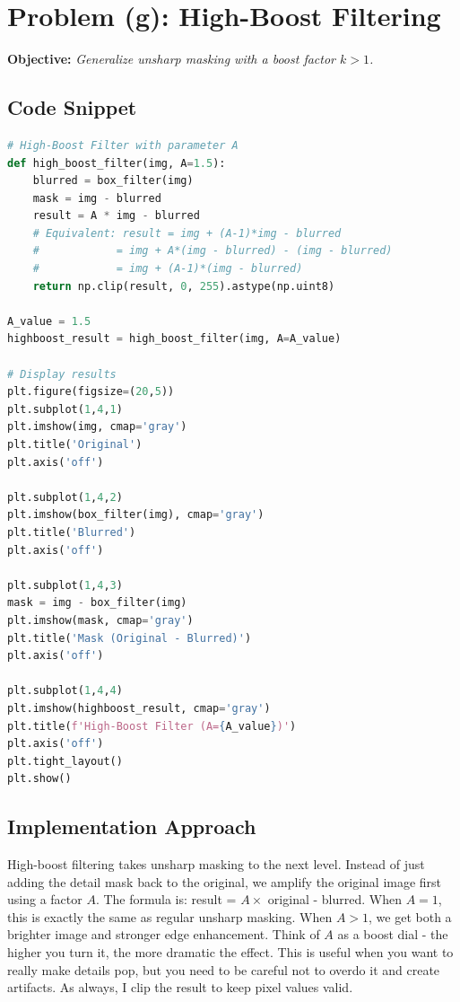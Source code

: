 \documentclass[12pt,a4paper]{report}
\begin{document}
\section{Problem (g): High-Boost Filtering}
\textbf{Objective:} \textit{Generalize unsharp masking with a boost factor \(k>1\).}

\subsection{Code Snippet}
\begin{lstlisting}[language=Python, caption={High-Boost Filtering}]
# High-Boost Filter with parameter A
def high_boost_filter(img, A=1.5):
    blurred = box_filter(img)
    mask = img - blurred
    result = A * img - blurred
    # Equivalent: result = img + (A-1)*img - blurred
    #            = img + A*(img - blurred) - (img - blurred)
    #            = img + (A-1)*(img - blurred)
    return np.clip(result, 0, 255).astype(np.uint8)

A_value = 1.5
highboost_result = high_boost_filter(img, A=A_value)

# Display results
plt.figure(figsize=(20,5))
plt.subplot(1,4,1)
plt.imshow(img, cmap='gray')
plt.title('Original')
plt.axis('off')

plt.subplot(1,4,2)
plt.imshow(box_filter(img), cmap='gray')
plt.title('Blurred')
plt.axis('off')

plt.subplot(1,4,3)
mask = img - box_filter(img)
plt.imshow(mask, cmap='gray')
plt.title('Mask (Original - Blurred)')
plt.axis('off')

plt.subplot(1,4,4)
plt.imshow(highboost_result, cmap='gray')
plt.title(f'High-Boost Filter (A={A_value})')
plt.axis('off')
plt.tight_layout()
plt.show()
\end{lstlisting}

\subsection{Implementation Approach}
High-boost filtering takes unsharp masking to the next level. Instead of just adding the detail mask back to the original, we amplify the original image first using a factor \(A\). The formula is: result = \(A \times\) original - blurred. When \(A=1\), this is exactly the same as regular unsharp masking. When \(A>1\), we get both a brighter image and stronger edge enhancement. Think of \(A\) as a boost dial - the higher you turn it, the more dramatic the effect. This is useful when you want to really make details pop, but you need to be careful not to overdo it and create artifacts. As always, I clip the result to keep pixel values valid.
\end{document}

